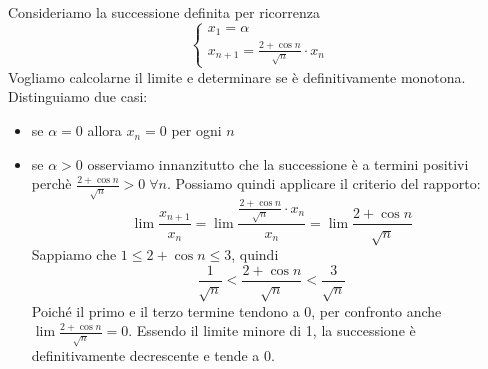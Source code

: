 \begin{example}
Consideriamo la successione definita per ricorrenza
\begin{equation*}
\begin{cases}
x_1 = \alpha \\
x_{n+1} = \frac{2 + \cos n}{\sqrt{n}} \cdot x_n
\end{cases}
\end{equation*}
Vogliamo calcolarne il limite e determinare se è definitivamente monotona. Distinguiamo due casi:
\begin{itemize}
\item se $\alpha = 0$ allora $x_n = 0$ per ogni $n$
\item se $\alpha > 0$ osserviamo innanzitutto che la successione è a termini positivi perchè $\frac{2+\cos n}{\sqrt{n}} > 0 \; \forall n$. Possiamo quindi applicare il criterio del rapporto:
\begin{equation*}
\lim \frac{x_{n+1}}{x_n} = \lim \frac{\frac{2 + \cos n}{\sqrt{n}} \cdot x_n}{x_n} = \lim \frac{2 + \cos n}{\sqrt{n}}
\end{equation*}
Sappiamo che $1 \le 2 + \cos n \le 3$, quindi
\begin{equation*}
\frac{1}{\sqrt{n}} < \frac{2+\cos n}{\sqrt{n}} < \frac{3}{\sqrt{n}}
\end{equation*}
Poiché il primo e il terzo termine tendono a 0, per confronto anche $\lim \frac{2+\cos n}{\sqrt{n}} = 0$. Essendo il limite minore di 1, la successione è definitivamente decrescente e tende a 0.
\end{itemize}
\end{example}